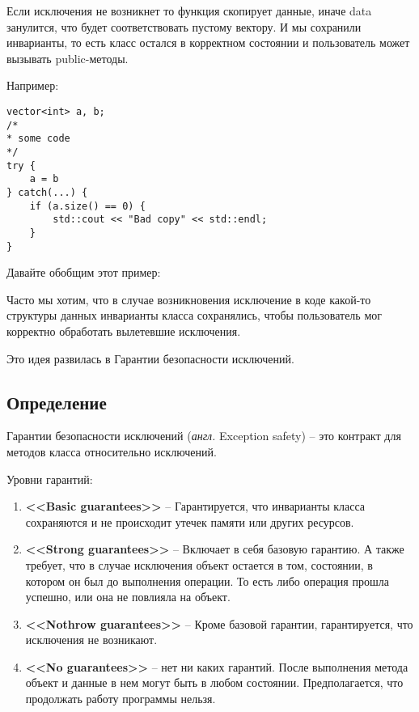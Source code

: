 Если исключения не возникнет то функция скопирует данные, иначе data занулится, что будет соответствовать пустому вектору. И мы сохранили инварианты, то есть класс остался в корректном состоянии и пользователь может вызывать public-методы.

Например:
\begin{verbatim}
vector<int> a, b;
/*
* some code
*/
try {
    a = b
} catch(...) {
    if (a.size() == 0) {
        std::cout << "Bad copy" << std::endl;
    }
}
\end{verbatim}

Давайте обобщим этот пример:

Часто мы хотим, что в случае возникновения исключение в коде какой-то структуры данных инварианты класса сохранялись, чтобы пользователь мог корректно обработать вылетевшие исключения.

Это идея развилась в Гарантии безопасности исключений.

\subsection{Определение}

Гарантии безопасности исключений (\textit{англ.} Exception safety) -- это контракт для методов класса относительно исключений.

Уровни гарантий:
\begin{enumerate}
\item \textbf{<<Basic guarantees>>} -- Гарантируется, что инварианты класса сохраняются и не происходит утечек памяти или других ресурсов.
\item \textbf{<<Strong guarantees>>} -- Включает в себя базовую гарантию. А также требует, что в случае исключения объект остается в том, состоянии, в котором он был до выполнения операции. То есть либо операция прошла успешно, или она не повлияла на объект.
\item \textbf{<<Nothrow guarantees>>} -- Кроме базовой гарантии, гарантируется, что исключения не возникают.
\item \textbf{<<No guarantees>>} -- нет ни каких гарантий. После выполнения метода объект и данные в нем могут быть в любом состоянии. Предполагается, что продолжать работу программы нельзя.
\end{enumerate}

